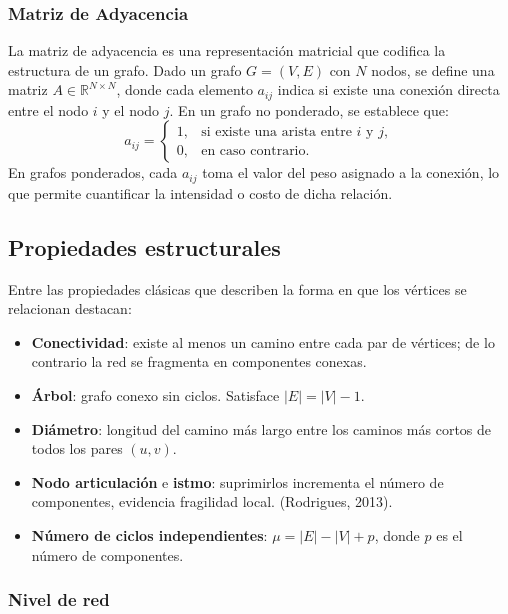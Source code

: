 \documentclass[openany]{book}
\begin{document}
			\subsubsection{Matriz de Adyacencia}
				La matriz de adyacencia es una representación matricial que codifica la estructura de un grafo. Dado un grafo $G=(V,E)$ con $N$ nodos, se define una matriz $A \in \mathbb{R}^{N \times N}$, donde cada elemento $a_{ij}$ indica si existe una conexión directa entre el nodo $i$ y el nodo $j$. En un grafo no ponderado, se establece que:
				\begin{equation}
					a_{ij} =
					\begin{cases}
						1, & \text{si existe una arista entre } i \text{ y } j,\\
						0, & \text{en caso contrario.}
					\end{cases}
				\end{equation}
				En grafos ponderados, cada $a_{ij}$ toma el valor del peso asignado a la conexión, lo que permite cuantificar la intensidad o costo de dicha relación.

		\subsection{Propiedades estructurales}

		Entre las propiedades clásicas que describen la forma en que los vértices se relacionan destacan:
		\begin{itemize}
			\item \textbf{Conectividad}: existe al menos un camino entre cada par de vértices; de lo contrario la red se fragmenta en componentes conexas.
			\item \textbf{Árbol}: grafo conexo sin ciclos. Satisface $|E|=|V|-1$.
			\item \textbf{Diámetro}: longitud del camino más largo entre los caminos más cortos de todos los pares $(u,v)$.
			\item \textbf{Nodo articulación} e \textbf{istmo}: suprimirlos incrementa el número de componentes, evidencia fragilidad local. (Rodrigues, 2013).
			\item \textbf{Número de ciclos independientes}: $\mu = |E|-|V|+p$, donde $p$ es el número de componentes.
		\end{itemize}

		\subsubsection*{Nivel de red}
\end{document}
